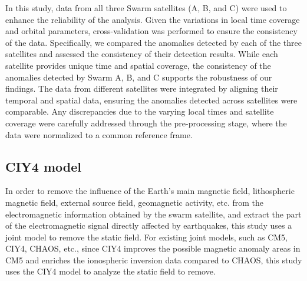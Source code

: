 \documentclass[3p,authoryear,preprint,12pt]{elsarticle}
\begin{document}
{In this study, data from all three Swarm satellites (A, B, and C) were used to enhance the reliability of the analysis. Given the variations in local time coverage and orbital parameters, cross-validation was performed to ensure the consistency of the data. Specifically, we compared the anomalies detected by each of the three satellites and assessed the consistency of their detection results. While each satellite provides unique time and spatial coverage, the consistency of the anomalies detected by Swarm A, B, and C supports the robustness of our findings. The data from different satellites were integrated by aligning their temporal and spatial data, ensuring the anomalies detected across satellites were comparable. Any discrepancies due to the varying local times and satellite coverage were carefully addressed through the pre-processing stage, where the data were normalized to a common reference frame.}
\subsection{CIY4 model}

{In order to remove the influence of the Earth's main magnetic field, lithospheric magnetic field, external source field, geomagnetic activity, etc. from the electromagnetic information obtained by the swarm satellite, and extract the part of the electromagnetic signal directly affected by earthquakes, this study uses a joint model to remove the static field. For existing joint models, such as CM5, CIY4, CHAOS, etc., since CIY4 improves the possible magnetic anomaly areas in CM5 and enriches the ionospheric inversion data compared to CHAOS, this study uses the CIY4 model to analyze the static field to remove.}
\end{document}
